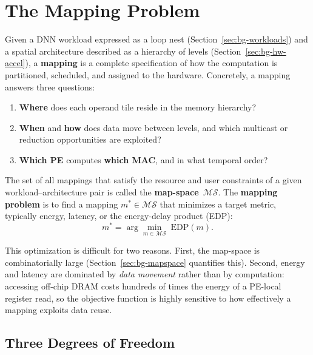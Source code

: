 \section{The Mapping Problem}
\label{sec:bg-mapping}

Given a DNN workload expressed as a loop nest
(Section~\ref{sec:bg-workloads}) and a spatial architecture described as
a hierarchy of levels (Section~\ref{sec:bg-hw-accel}), a
\textbf{mapping} is a complete specification of how the computation is
partitioned, scheduled, and assigned to the hardware.
Concretely, a mapping answers three questions:
\begin{enumerate}
  \item \textbf{Where} does each operand tile reside in the memory
    hierarchy?
  \item \textbf{When} and \textbf{how} does data move between levels,
    and which multicast or reduction opportunities are exploited?
  \item \textbf{Which PE} computes \textbf{which MAC}, and in what
    temporal order?
\end{enumerate}

The set of all mappings that satisfy the resource and user constraints
of a given workload--architecture pair is called the
\textbf{map-space}~$\mathcal{MS}$.
The \textbf{mapping problem} is to find a mapping
$m^{*}\!\in\mathcal{MS}$ that minimizes a target metric, typically
energy, latency, or the energy-delay product (EDP):
\begin{equation}
\label{eq:mapping-problem}
m^{*} = \arg\min_{m\in\mathcal{MS}} \; \text{EDP}(m).
\end{equation}

\noindent
This optimization is difficult for two reasons.
First, the map-space is combinatorially large
(Section~\ref{sec:bg-mapspace} quantifies this).
Second, energy and latency are dominated by \emph{data movement}
rather than by computation: accessing off-chip DRAM costs hundreds of
times the energy of a PE-local register read, so the objective function
is highly sensitive to how effectively a mapping exploits data reuse.


\subsection{Three Degrees of Freedom}
\label{sec:mapping-dof}

